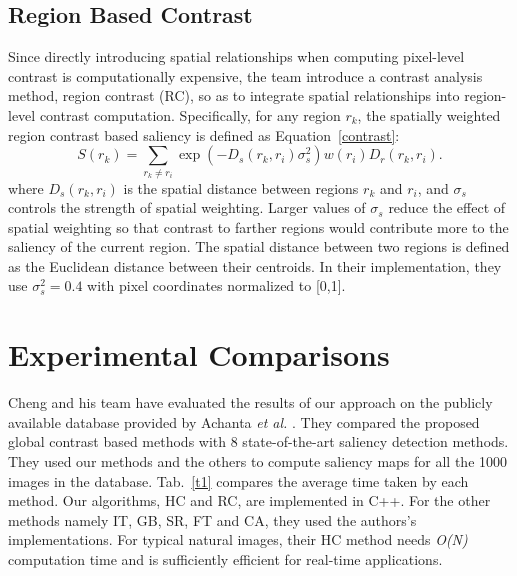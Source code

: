 \documentclass[10pt,twocolumn,letterpaper]{article}
\begin{document}
\subsection{Region Based Contrast}

Since directly introducing spatial relationships when computing pixel-level contrast is computationally expensive, the team introduce a contrast analysis method, region contrast (RC), so as to integrate spatial relationships into region-level contrast computation. Specifically, for any region $r_k$, the spatially weighted region contrast based saliency is defined as Equation~\ref{contrast}:
\begin{equation}
S(r_k)=\sum_{r_k\neq r_i}\exp(-D_s(r_k,r_i)\sigma_s^2)w(r_i)D_r(r_k,r_i).   \label{contrast}
\end{equation}
where $D_s(r_k,r_i)$ is the spatial distance between regions $r_k$ and $r_i$, and $\sigma_s$ controls the strength of spatial weighting. Larger values of $\sigma_s$ reduce the effect of spatial weighting so that contrast to farther regions would contribute more to the saliency of the current region. The spatial distance between two regions is defined as the Euclidean distance between their centroids. In their implementation, they use $\sigma_s^2= 0.4$ with pixel coordinates normalized to [0,1].

\section{Experimental Comparisons}

Cheng and his team have evaluated the results of our approach on the publicly available database provided by Achanta \emph{et al.} \cite{Achanta2009Frequency}. They compared the proposed global contrast based methods with 8 state-of-the-art saliency detection methods. They used our methods and the others to compute saliency maps for all the 1000 images in the database. Tab.~\ref{t1} compares the average time taken by each method. Our algorithms, HC and RC, are implemented in C++. For the other methods namely IT, GB, SR, FT and CA, they used the authors's implementations. For typical natural images, their HC method needs \emph{O(N)} computation time and is sufficiently efficient for real-time applications.

{\small


}
\end{document}
